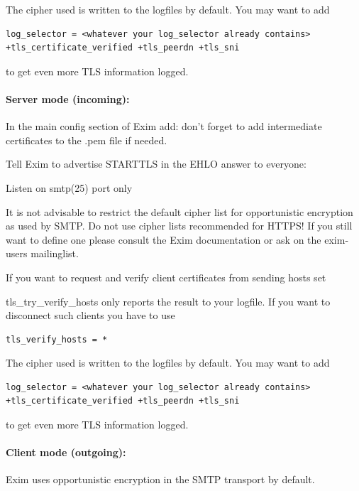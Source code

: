 The cipher used is written to the logfiles by default. You may want to add
\begin{lstlisting}
log_selector = <whatever your log_selector already contains> +tls_certificate_verified +tls_peerdn +tls_sni
\end{lstlisting}
to get even more TLS information logged.


\paragraph{Server mode (incoming):}
In the main config section of Exim add:
don't forget to add intermediate certificates to the .pem file if needed.

Tell Exim to advertise STARTTLS in the EHLO answer to everyone:

Listen on smtp(25) port only

It is not advisable to restrict the default cipher list for opportunistic encryption as used by SMTP. Do not use cipher lists recommended for HTTPS! If you still want to define one please consult the Exim documentation or ask on the exim-users mailinglist.

If you want to request and verify client certificates from sending hosts set

tls\_try\_verify\_hosts only reports the result to your logfile. If you want to disconnect such clients you have to use
\begin{lstlisting}
tls_verify_hosts = *
\end{lstlisting}

The cipher used is written to the logfiles by default. You may want to add
\begin{lstlisting}
log_selector = <whatever your log_selector already contains> +tls_certificate_verified +tls_peerdn +tls_sni
\end{lstlisting}
to get even more TLS information logged.

\paragraph{Client mode (outgoing):}
Exim uses opportunistic encryption in the SMTP transport by default.

